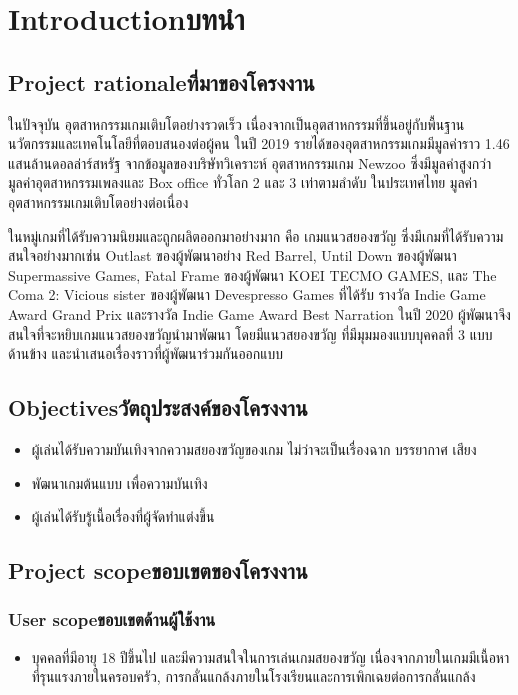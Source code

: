 \chapter{\ifenglish Introduction\else บทนำ\fi}

\section{\ifenglish Project rationale\else ที่มาของโครงงาน\fi}
ในปัจจุบัน อุตสาหกรรมเกมเติบโตอย่างรวดเร็ว เนื่องจากเป็นอุตสาหกรรมที่ขึ้นอยู่กับพื้นฐานนวัตกรรมและเทคโนโลยีที่ตอบสนองต่อผู้คน ในปี 2019 รายได้ของอุตสาหกรรมเกมมีมูลค่าราว 1.46 แสนล้านดอลล่าร์สหรัฐ จากข้อมูลของบริษัทวิเคราะห์
อุตสาหกรรมเกม Newzoo ซึ่งมีมูลค่าสูงกว่ามูลค่าอุตสาหกรรมเพลงและ Box office ทั่วโลก 2 และ 3 เท่าตามลำดับ ในประเทศไทย มูลค่าอุตสาหกรรมเกมเติบโตอย่างต่อเนื่อง 


ในหมู่เกมที่ได้รับความนิยมและถูกผลิตออกมาอย่างมาก คือ เกมแนวสยองขวัญ ซึ่งมีเกมที่ได้รับความสนใจอย่างมากเช่น Outlast ของผู้พัฒนาอย่าง Red Barrel, Until Down ของผู้พัฒนา Supermassive Games, 
Fatal Frame ของผู้พัฒนา KOEI TECMO GAMES, และ The Coma 2: Vicious sister ของผู้พัฒนา Devespresso Games ที่ได้รับ รางวัล Indie Game Award Grand Prix และรางวัล Indie Game Award Best Narration 
ในปี 2020 ผู้พัฒนาจึงสนใจที่จะหยิบเกมแนวสยองขวัญนำมาพัฒนา โดยมีแนวสยองขวัญ ที่มีมุมมองแบบบุคคลที่ 3 แบบด้านข้าง และนำเสนอเรื่องราวที่ผู้พัฒนาร่วมกันออกแบบ
\section{\ifenglish Objectives\else วัตถุประสงค์ของโครงงาน\fi}

\begin{itemize}
    \item ผู้เล่นได้รับความบันเทิงจากความสยองขวัญของเกม ไม่ว่าจะเป็นเรื่องฉาก บรรยากาศ เสียง
    \item พัฒนาเกมต้นแบบ เพื่อความบันเทิง
    \item ผู้เล่นได้รับรู้เนื้อเรื่องที่ผู้จัดทำแต่งขึ้น
\end{itemize}

\section{\ifenglish Project scope\else ขอบเขตของโครงงาน\fi}

\subsection{\ifenglish User scope\else ขอบเขตด้านผู้ใช้งาน\fi}
\begin{itemize}
    \item บุคคลที่มีอายุ 18 ปีขึ้นไป และมีความสนใจในการเล่นเกมสยองขวัญ เนื่องจากภายในเกมมีเนื้อหาที่รุนแรงภายในครอบครัว, การกลั่นแกล้งภายในโรงเรียนและการเพิกเฉยต่อการกลั่นแกล้ง
\end{itemize}


